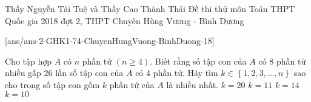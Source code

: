 \begin{name}
{Thầy Nguyễn Tài Tuệ và Thầy Cao Thành Thái}
{Đề thi thử môn Toán THPT Quốc gia 2018 đợt 2, THPT Chuyên Hùng Vương - Bình Dương}
\end{name}
\setcounter{ex}{0}\setcounter{bt}{0}
[ans/ans-2-GHK1-74-ChuyenHungVuong-BinhDuong-18]

\begin{ex}%
Cho tập hợp $A$ có $n$ phần tử $\left ( n\ge 4\right )$. Biết rằng số tập con của $A$ có 8 phần tử nhiều gấp $26$ lần số tập con của $A$ có 4 phần tử. Hãy tìm $k\in \left \{ 1,2,3, \dots ,n \right \}$ sao cho trong số tập con gồm $k$ phần tử của $A$ là nhiều nhất.
 \choice
 {$k=20$}
 {$k=11$}
 {$k=14$}
 {\True $k=10$}
\end{ex}

